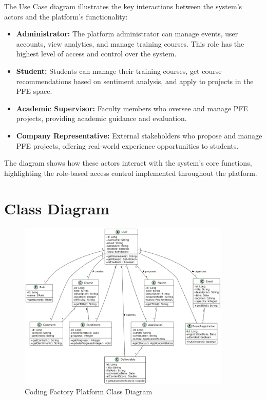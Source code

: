\documentclass[12pt,a4paper]{report}
\begin{document}
The Use Case diagram illustrates the key interactions between the system's actors and the platform's functionality:

\begin{itemize}
    \item \textbf{Administrator:} The platform administrator can manage events, user accounts, view analytics, and manage training courses. This role has the highest level of access and control over the system.

    \item \textbf{Student:} Students can manage their training courses, get course recommendations based on sentiment analysis, and apply to projects in the PFE space.

    \item \textbf{Academic Supervisor:} Faculty members who oversee and manage PFE projects, providing academic guidance and evaluation.

    \item \textbf{Company Representative:} External stakeholders who propose and manage PFE projects, offering real-world experience opportunities to students.
\end{itemize}

The diagram shows how these actors interact with the system's core functions, highlighting the role-based access control implemented throughout the platform.

\section{Class Diagram}

\begin{figure}[!htbp]
\centering
\includegraphics[width=0.9\textwidth]{media/diagramclass.png}
\caption{Coding Factory Platform Class Diagram}
\label{fig:class-diagram}
\end{figure}
\end{document}
